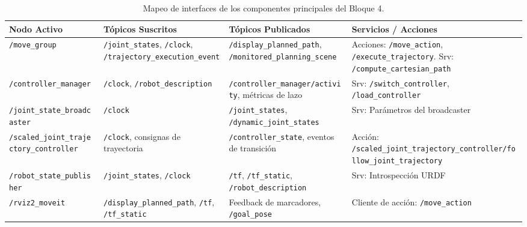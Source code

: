 \documentclass[11pt,a4paper]{article}
\begin{document}
\begin{table}[htbp]
    \centering
    \footnotesize
    \begin{tabularx}{\textwidth}{>{\raggedright\arraybackslash}p{3.5cm} >{\raggedright\arraybackslash}p{3.4cm} >{\raggedright\arraybackslash}p{3.5cm} >{\raggedright\arraybackslash}X}
        \toprule
        \textbf{Nodo Activo} & \textbf{Tópicos Suscritos} & \textbf{Tópicos Publicados} & \textbf{Servicios / Acciones} \\
        \midrule
        \texttt{/move\_group} & \texttt{/joint\_states}, \texttt{/clock}, \texttt{/trajectory\_}\-\texttt{execution\_event} & \texttt{/display\_}\allowbreak\texttt{planned\_path}, \texttt{/monitored\_}\-\texttt{planning\_scene} & Acciones: \texttt{/move\_action}, \texttt{/execute\_trajectory}. \newline Srv: \texttt{/compute\_}\-\texttt{cartesian\_path} \\
        \addlinespace
        \texttt{/controller\_manager} & \texttt{/clock}, \texttt{/robot\_description} & \texttt{/controller\_}\allowbreak\texttt{manager/activity}, métricas de lazo & Srv: \texttt{/switch\_controller}, \texttt{/load\_controller} \\
        \addlinespace
        \texttt{/joint\_state\_}\-\texttt{broadcaster} & \texttt{/clock} & \texttt{/joint\_states}, \texttt{/dynamic\_joint\_states} & Srv: Parámetros del broadcaster \\
        \addlinespace
        \texttt{/scaled\_joint\_}\newline\texttt{trajectory\_controller} & \texttt{/clock}, consignas de trayectoria & \texttt{/controller\_state}, eventos de transición & Acción: \newline \texttt{/scaled\_joint\_}\allowbreak\texttt{trajectory\_}\allowbreak\texttt{controller/}\allowbreak\texttt{follow\_joint\_}\allowbreak\texttt{trajectory} \\
        \addlinespace
        \texttt{/robot\_state\_}\-\texttt{publisher} & \texttt{/joint\_states}, \texttt{/clock} & \texttt{/tf}, \texttt{/tf\_static}, \texttt{/robot\_description} & Srv: Introspección URDF \\
        \addlinespace
        \texttt{/rviz2\_moveit} & \texttt{/display\_}\allowbreak\texttt{planned\_path}, \texttt{/tf}, \texttt{/tf\_static} & Feedback de marcadores, \texttt{/goal\_pose} & Cliente de acción: \texttt{/move\_action} \\
        \bottomrule
    \end{tabularx}
    \caption{Mapeo de interfaces de los componentes principales del Bloque 4.}
    \label{tab:mapeo_interfaces_ur3e}
\end{table}
\end{document}
